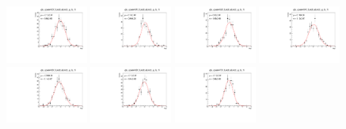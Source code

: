 \begin{figure}[h]\centering
    \includegraphics[width=0.24\textwidth]{figure/io/gls/pull_gls_epem4600_Lmdc.aLmdc_g_ls_1i.pdf}
    \includegraphics[width=0.24\textwidth]{figure/io/gls/pull_gls_epem4612_Lmdc.aLmdc_g_ls_1i.pdf}
    \includegraphics[width=0.24\textwidth]{figure/io/gls/pull_gls_epem4626_Lmdc.aLmdc_g_ls_1i.pdf}
    \includegraphics[width=0.24\textwidth]{figure/io/gls/pull_gls_epem4640_Lmdc.aLmdc_g_ls_1i.pdf}
    \includegraphics[width=0.24\textwidth]{figure/io/gls/pull_gls_epem4660_Lmdc.aLmdc_g_ls_1i.pdf}
    \includegraphics[width=0.24\textwidth]{figure/io/gls/pull_gls_epem4680_Lmdc.aLmdc_g_ls_1i.pdf}
    \includegraphics[width=0.24\textwidth]{figure/io/gls/pull_gls_epem4700_Lmdc.aLmdc_g_ls_1i.pdf}

\end{figure}
